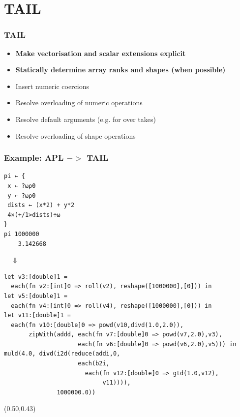 \documentclass{beamer}
\begin{document}
\section{TAIL}

\begin{frame}
\frametitle{TAIL}

  \begin{itemize}
  \item \textbf{Make vectorisation and scalar extensions explicit}
  \item \textbf{Statically determine array ranks and shapes (when possible)}
  \item Insert numeric coercions
  \item Resolve overloading of numeric operations
  \item Resolve %
    default arguments
    (e.g. for over takes)
  \item Resolve overloading of shape operations
  \end{itemize}

\end{frame}


\begin{frame}[fragile]
\frametitle{Example: APL $->$ TAIL}
{\footnotesize
\begin{verbatim}
pi ← { 
 x ← ?⍵⍴0
 y ← ?⍵⍴0
 dists ← (x*2) + y*2
 4×(+/1>dists)÷⍵
}
pi 1000000
    3.142668
\end{verbatim}
\vspace{-2mm}
$\quad\Downarrow$
\vspace{-2mm}
\begin{verbatim}
let v3:[double]1 = 
  each(fn v2:[int]0 => roll(v2), reshape([1000000],[0])) in
let v5:[double]1 =
  each(fn v4:[int]0 => roll(v4), reshape([1000000],[0])) in
let v11:[double]1 = 
  each(fn v10:[double]0 => powd(v10,divd(1.0,2.0)),
       zipWith(addd, each(fn v7:[double]0 => powd(v7,2.0),v3),
                     each(fn v6:[double]0 => powd(v6,2.0),v5))) in
muld(4.0, divd(i2d(reduce(addi,0,
                     each(b2i,
                       each(fn v12:[double]0 => gtd(1.0,v12),
                            v11)))),
               1000000.0))
\end{verbatim}
}

\begin{textblock*}{64mm}(0.50\textwidth,0.43\textheight)
\end{textblock*}

\end{frame}
\end{document}
